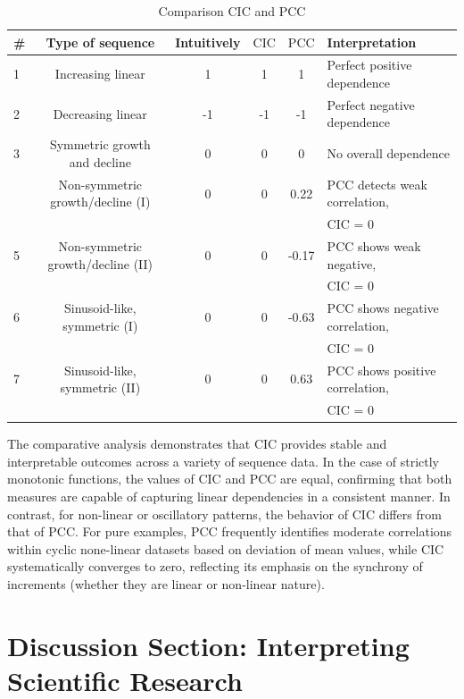 \documentclass[aoas]{imsart}
\newcommand{\cic}{\text{CIC}}
\newcommand{\pcc}{\text{PCC}}
\begin{document}
\begin{table}
\caption{Comparison $\cic$ and $\pcc$}
\label{table1}
\begin{tabular}{@{}lccccl@{}}
\hline
\# &
Type of sequence &
Intuitively &
$\cic$ &
$\pcc$ &
Interpretation \\
\hline
1 & Increasing linear               & 1  & 1 & 1    & Perfect positive dependence \\
2 & Decreasing linear               & -1 & -1 & -1  & Perfect negative dependence \\
3 & Symmetric growth and decline    & 0  & 0 & 0    & No overall dependence \\
 & Non-symmetric growth/decline (I) & 0 & 0 & 0.22 
  & $\pcc$ detects weak correlation,\\
  & & & & & $\cic$ = 0 \\
5 & Non-symmetric growth/decline (II)& 0  & 0 & -0.17 
  & $\pcc$ shows weak negative,\\
  & & & & & $\cic$ = 0 \\
6 & Sinusoid-like, symmetric (I)     & 0  & 0 & -0.63 
  & $\pcc$ shows negative correlation,\\
  & & & & & $\cic$ = 0 \\
7 & Sinusoid-like, symmetric (II)    & 0  & 0 & 0.63 
  & $\pcc$ shows positive correlation,\\
  & & & & & $\cic$ = 0 \\
\hline
\end{tabular}
\end{table}

The comparative analysis demonstrates that $\cic$ provides stable and interpretable outcomes across a variety of sequence data. In the case of strictly monotonic functions, the values of $\cic$ and $\pcc$ are equal, confirming that both measures are capable of capturing linear dependencies in a consistent manner.
In contrast, for non-linear or oscillatory patterns, the behavior of $\cic$ differs from that of $\pcc$. For pure examples, $\pcc$ frequently identifies moderate correlations within cyclic none-linear datasets based on deviation of mean values, while $\cic$ systematically converges to zero, reflecting its emphasis on the synchrony of increments (whether they are linear or non-linear nature).

\section{Discussion Section: Interpreting Scientific Research}
\end{document}
